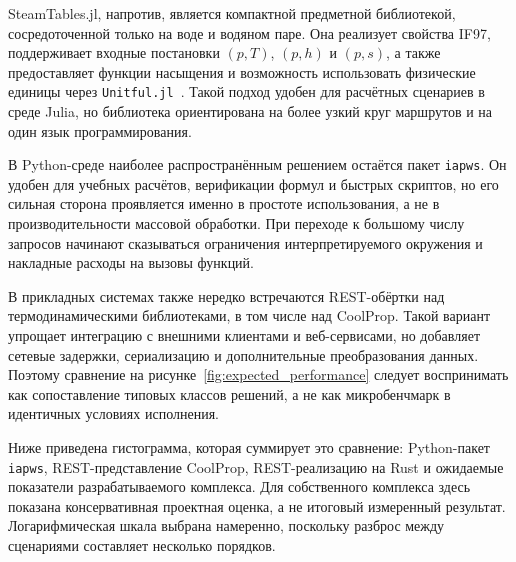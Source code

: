 SteamTables.jl, напротив, является компактной предметной библиотекой,
сосредоточенной только на воде и водяном паре.
Она реализует свойства IF97,
поддерживает входные постановки $(p, T)$, $(p, h)$ и $(p, s)$,
а также предоставляет функции насыщения
и возможность использовать физические единицы через \texttt{Unitful.jl}~\cite{steamtables_jl}.
Такой подход удобен для расчётных сценариев в среде Julia,
но библиотека ориентирована на более узкий круг маршрутов
и на один язык программирования.

В Python-среде наиболее распространённым решением остаётся пакет \texttt{iapws}.
Он удобен для учебных расчётов, верификации формул и быстрых скриптов,
но его сильная сторона проявляется именно в простоте использования,
а не в производительности массовой обработки.
При переходе к большому числу запросов начинают сказываться ограничения
интерпретируемого окружения и накладные расходы на вызовы функций.

В прикладных системах также нередко встречаются REST-обёртки над термодинамическими
библиотеками, в том числе над CoolProp.
Такой вариант упрощает интеграцию с внешними клиентами и веб-сервисами,
но добавляет сетевые задержки, сериализацию и дополнительные преобразования данных.
Поэтому сравнение на рисунке~\ref{fig:expected_performance}
следует воспринимать как сопоставление типовых классов решений,
а не как микробенчмарк в идентичных условиях исполнения.

Ниже приведена гистограмма, которая суммирует это сравнение:
Python-пакет \texttt{iapws}, REST-представление CoolProp,
REST-реализацию на Rust и ожидаемые показатели разрабатываемого комплекса.
Для собственного комплекса здесь показана консервативная проектная оценка,
а не итоговый измеренный результат.
Логарифмическая шкала выбрана намеренно,
поскольку разброс между сценариями составляет несколько порядков.

